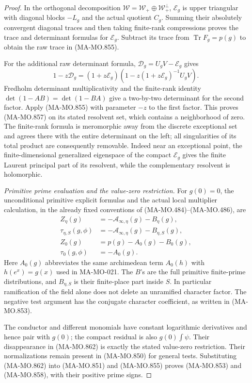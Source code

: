\begin{proof}
In the orthogonal decomposition
\(\mathcal W=\mathcal W_+\oplus\mathcal W_+^\perp\),
\(\mathscr E_g\) is upper triangular with
diagonal blocks \(-L_g\) and the actual
quotient \(C_g\). Summing their absolutely
convergent diagonal traces and then taking
finite-rank compressions proves the trace
and determinant formulas for \(\mathscr E_g\).
Subtract its trace from \(\operatorname{Tr}F_g=p(g)\)
to obtain the raw trace in (MA-MO.855).

For the additional raw determinant formula,
\(\mathscr D_g=U_gV-\mathscr E_g\) gives
\[
  1-z\mathscr D_g
     =(1+z\mathscr E_g)
       \left(1-z(1+z\mathscr E_g)^{-1}U_gV\right).
 \tag{MA-MO.861}
\]
Fredholm determinant multiplicativity and the
finite-rank identity \(\det(1-AB)=\det(1-BA)\)
give a two-by-two determinant for the second
factor. Apply (MA-MO.855) with parameter
\(-z\) to the first factor. This proves
(MA-MO.857) on its stated resolvent set,
which contains a neighborhood of zero.
The finite-rank formula is meromorphic away
from the discrete exceptional set and agrees
there with the entire determinant on the
left; all singularities of its total product
are consequently removable. Indeed near an
exceptional point, the finite-dimensional
generalized eigenspace of the compact
\(\mathscr E_g\) gives the finite Laurent
principal part of its resolvent, while the
complementary resolvent is holomorphic.

\emph{Primitive prime evaluation and the value-zero restriction.}
For \(g(0)=0\), the unconditional primitive
explicit formulas and the actual local multiplier
calculation, in the already fixed conventions
of (MA-MO.484)--(MA-MO.486), are
\[
 \begin{aligned}
 Z_\eta(g)
    &=-\mathcal A_{\infty,\eta}(g)-B_\eta(g),\\
 \tau_{\eta,S}(g,\phi)
    &=-\mathcal A_{\infty,\eta}(g)-B_{\eta,S}(g),\\
 Z_0(g)&=p(g)-A_0(g)-B_0(g),\\
 \tau_0(g,\phi)&=-A_0(g).
 \end{aligned}
 \tag{MA-MO.862}
\]
Here \(A_0(g)\) abbreviates the same archimedean
term \(A_0(h)\) with \(h(e^x)=g(x)\) used
in MA-MO-021. The \(B\)'s are the full
primitive finite-prime distributions, and
\(B_{\eta,S}\) is their finite-place part
inside \(S\). In particular ramification of
the field alone does not delete an unramified
character factor. The negative test argument
has the conjugate character coefficient,
as written in (MA-MO.853).

The conductor and different monomials have
constant logarithmic derivatives and hence
pair with \(g(0)\); the compact residual is
also \(g(0)\int\psi\). Their disappearance
in (MA-MO.862) is exactly the stated
value-zero restriction. Their normalizations
remain present in (MA-MO.850) for general
tests. Substituting (MA-MO.862) into
(MA-MO.851) and (MA-MO.855) proves
(MA-MO.853) and (MA-MO.858), with their
positive prime signs.
\end{proof}


